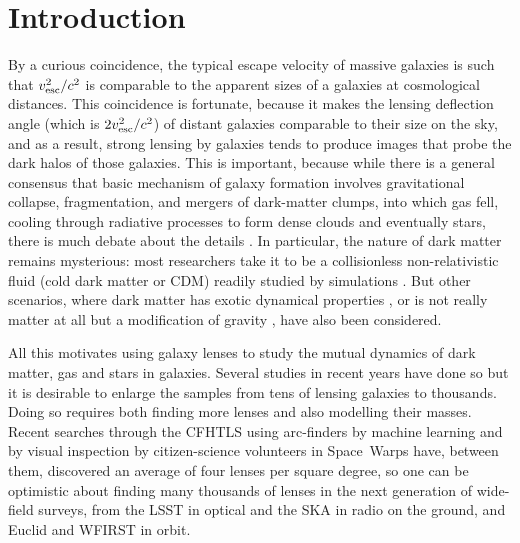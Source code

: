 \section{Introduction}

By a curious coincidence, the typical escape velocity of massive galaxies is
such that $v_{\rm esc}^2/c^2$ is comparable to the apparent sizes of a
galaxies at cosmological distances.  This coincidence is fortunate,
because it makes the lensing deflection angle (which is $2v_{\rm
  esc}^2/c^2$) of distant galaxies comparable to their size on the
sky, and as a result, strong lensing by galaxies tends to produce
images that probe the dark halos of those galaxies.  This is
important, because while there is a general consensus that basic
mechanism of galaxy formation involves gravitational collapse,
fragmentation, and mergers of dark-matter clumps, into which gas fell,
cooling through radiative processes to form dense clouds and
eventually stars, there is much debate about the details \citep[for a
  summary, see][]{2012RAA....12..917S}.  In particular, the nature of
dark matter remains mysterious: most researchers take it to be a
collisionless non-relativistic fluid (cold dark matter or CDM) readily
studied by simulations \citep[for example, the influential millenium
  simulation by][]{2005Natur.435..629S}.  But other scenarios, where
dark matter has exotic dynamical properties
\citep{2010MNRAS.405...77S,2016ApJ...818...89S}, or is not really
matter at all but a modification of gravity
\citep{2016PhRvL.117t1101M}, have also been considered.

All this motivates using galaxy lenses to study the mutual dynamics of
dark matter, gas and stars in galaxies.  Several studies in recent
years have done so
\citep{2009ApJ...703L..51K,2011ApJ...740...97L,2012MNRAS.424..104L,
  2016MNRAS.459.3677L,2016MNRAS.456..870B} but it is desirable to
enlarge the samples from tens of lensing galaxies to thousands.  Doing
so requires both finding more lenses and also modelling their masses.
Recent searches through the CFHTLS \citep{2012SPIE.8448E..0MC} using
arc-finders
\citep[e.g.,][]{2012ApJ...749...38M,2014A&A...567A.111M,2014ApJ...785..144G,2017arXiv170401585S}
by machine learning
\citep[e.g.,][]{2016A&A...592A..75P,2017arXiv170302642L} and by visual
inspection by citizen-science volunteers in Space~Warps
\citep{2016MNRAS.455.1191M} have, between them, discovered an average
of four lenses per square degree, so one can be optimistic about
finding many thousands of lenses in the next generation of wide-field
surveys, from the LSST in optical and the SKA in radio on the ground,
and Euclid and WFIRST in orbit.

